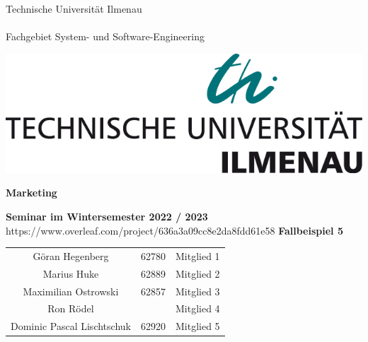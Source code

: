 \begin{titlepage}
    
    \begin{minipage}[b]{0.625\textwidth}
      Technische Universität Ilmenau\\
      \\
      Fachgebiet System- und Software-Engineering
    \end{minipage}%
    \hfill
    \begin{minipage}[b]{0.375\textwidth}
      \begin{flushright}
        \includegraphics[width=\textwidth]{tu_logo.jpg}
      \end{flushright}
    \end{minipage}
    \vspace*{12\baselineskip}
    
    \begin{centering}
    {\huge \textbf{Marketing}}\\
    \vspace*{1\baselineskip}
    
    {\large \textbf{Seminar im Wintersemester 2022 / 2023}}\\
    \vspace*{9\baselineskip}
    https://www.overleaf.com/project/636a3a09cc8e2da8fdd61e58
    {\LARGE \textbf{Fallbeispiel 5}}\\
    \vspace*{1\baselineskip}
    
    \begin{center}
        \large
        \begin{tabular}{ccc}
            Göran Hegenberg & 62780 & Mitglied 1 \\
            Marius Huke & 62889 & Mitglied 2 \\
            Maximilian Ostrowski & 62857 & Mitglied 3 \\
            Ron Rödel & & Mitglied 4 \\
            Dominic Pascal Lischtschuk & 62920 & Mitglied 5 \\
        \end{tabular}
    \end{center}
    \end{centering}
    
    \restoregeometry
    \end{titlepage}
    
    
    
    \tableofcontents
    \thispagestyle{empty} %
    \pagebreak %